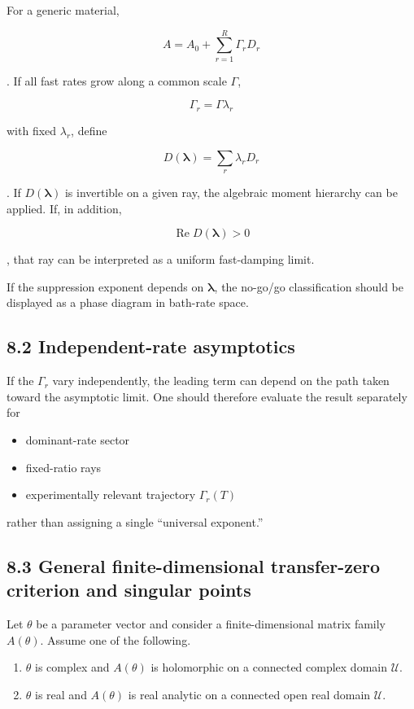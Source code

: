 \documentclass[
  10pt,
  a4paper,
]{article}
\providecommand{\tightlist}{%
  \setlength{\itemsep}{0pt}\setlength{\parskip}{0pt}}
\begin{document}
For a generic material,

\[
A=A_0+\sum_{r=1}^{R}\Gamma_rD_r
\]

. If all fast rates grow along a common scale \(\Gamma\),

\[
\Gamma_r=\Gamma\lambda_r
\]

with fixed \(\lambda_r\), define

\[
D(\boldsymbol\lambda)=\sum_r\lambda_rD_r
\]

. If \(D(\boldsymbol\lambda)\) is invertible on a given ray, the
algebraic moment hierarchy can be applied. If, in addition,

\[
\operatorname{Re}D(\boldsymbol\lambda)>0
\]

, that ray can be interpreted as a uniform fast-damping limit.

If the suppression exponent depends on \(\boldsymbol\lambda\), the
no-go/go classification should be displayed as a phase diagram in
bath-rate space.

\subsection{8.2 Independent-rate
asymptotics}\label{independent-rate-asymptotics}

If the \(\Gamma_r\) vary independently, the leading term can depend on
the path taken toward the asymptotic limit. One should therefore
evaluate the result separately for

\begin{itemize}
\tightlist
\item
  dominant-rate sector
\item
  fixed-ratio rays
\item
  experimentally relevant trajectory \(\Gamma_r(T)\)
\end{itemize}

rather than assigning a single ``universal exponent.''

\subsection{8.3 General finite-dimensional transfer-zero criterion and
singular
points}\label{general-finite-dimensional-transfer-zero-criterion-and-singular-points}

Let \(\theta\) be a parameter vector and consider a finite-dimensional
matrix family \(A(\theta)\). Assume one of the following.

\begin{enumerate}
\def\labelenumi{\arabic{enumi}.}
\tightlist
\item
  \(\theta\) is complex and \(A(\theta)\) is holomorphic on a connected
  complex domain \(\mathcal U\).
\item
  \(\theta\) is real and \(A(\theta)\) is real analytic on a connected
  open real domain \(\mathcal U\).
\end{enumerate}
\end{document}
